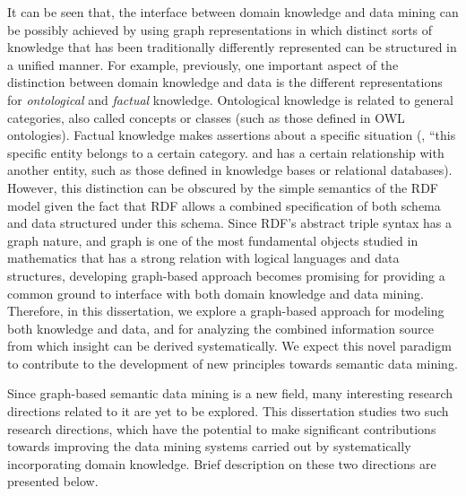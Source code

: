 It can be seen that, the interface between domain knowledge and data mining can be possibly achieved by using graph representations in which distinct sorts of knowledge that has been traditionally differently represented can be structured in a unified manner. For example, previously, one important aspect of the distinction between domain knowledge and data is the different representations for \emph{ontological} and \emph{factual} knowledge. Ontological knowledge is related to general categories, also called concepts or classes (such as those defined in OWL ontologies). Factual knowledge makes assertions about a specific situation (\eg, ``this specific entity belongs to a certain category. and has a certain relationship with another entity, such as those defined in knowledge bases or relational databases). However, this distinction can be obscured by the simple semantics of the RDF model given the fact that RDF allows a combined specification of both schema and data structured under this schema. Since RDF's abstract triple syntax has a graph nature, and graph is one of the most fundamental objects studied in mathematics that has a strong relation with logical languages and data structures, developing graph-based approach becomes promising for providing a common ground to interface with both domain knowledge and data mining. Therefore, in this dissertation, we explore a graph-based approach for modeling both knowledge and data, and for analyzing the combined information source from which insight can be derived systematically. We expect this novel paradigm to contribute to the development of new principles towards semantic data mining.



Since graph-based semantic data mining is a new field, many interesting research directions related to it are yet to be explored. This dissertation studies two such research directions, which have the potential to make significant contributions towards improving the data mining systems carried out by systematically incorporating domain knowledge. Brief description on these two directions are presented below.

